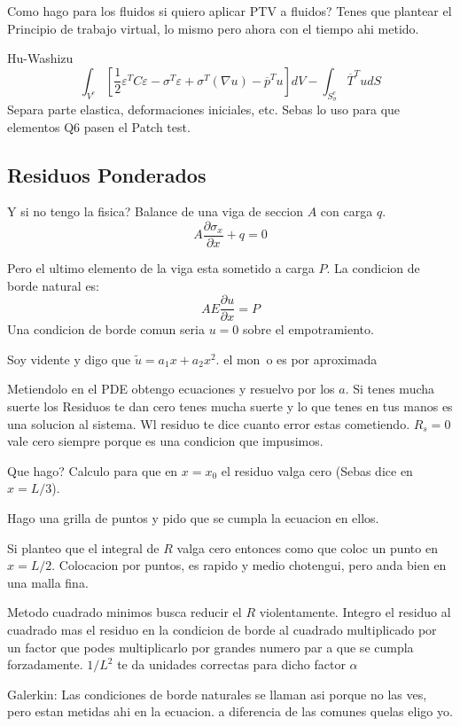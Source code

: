 \documentclass[11pt, a4paper,titlepage]{article}
\begin{document}
Como hago para los fluidos si quiero aplicar PTV a fluidos? Tenes que plantear el Principio de trabajo virtual, lo mismo pero ahora con el tiempo ahi metido.


Hu-Washizu
\[
\int_{V^{e}}\left[\frac{1}{2} \varepsilon^{T} C \varepsilon-\sigma^{T} \varepsilon+\sigma^{T}(\nabla u)-\overline{p}^{T} u\right] d V-\int_{S_{\sigma}^{e}} \overline{T}^{T} u d S
\]
Separa parte elastica, deformaciones iniciales,  etc. Sebas lo uso para que elementos Q6 pasen el Patch test.

\subsection{Residuos Ponderados}
Y si no tengo la fisica? Balance de una viga de seccion $A$ con carga $q$.
\[
A \frac{\partial \sigma_{x}}{\partial x}+q=0
\]

Pero el ultimo elemento de la viga esta sometido a carga $P$. La condicion de borde natural es:
\[
A E \frac{\partial u}{\partial x}=P
\]
Una condicion de borde comun seria $u=0$ sobre el empotramiento.

Soy vidente y digo que $\widetilde{u}=a_{1} x+a_{2} x^{2}$. el mon~o es por aproximada

Metiendolo en el PDE obtengo ecuaciones y resuelvo por los $a$. Si tenes mucha suerte los Residuos te dan cero tenes mucha suerte y lo que tenes en tus manos es una solucion al sistema. Wl residuo te dice cuanto error estas cometiendo. $R_s=0$ vale cero siempre porque es una condicion que impusimos.


Que hago? Calculo para que en $x=x_0$ el residuo valga cero (Sebas dice en $x=L/3$).  

Hago una grilla de puntos y pido que se cumpla la ecuacion en ellos.

Si planteo que el integral de $R$ valga cero entonces como que coloc un punto en $x=L/2$. Colocacion por puntos, es rapido y medio chotengui, pero anda bien en una malla fina. 

Metodo cuadrado minimos busca reducir el $R$ violentamente. Integro el residuo al cuadrado mas el residuo en la condicion de borde al cuadrado multiplicado por un factor que podes multiplicarlo por grandes numero par a que se cumpla forzadamente. $1/L^2$ te da unidades correctas para dicho factor $\alpha$ 

Galerkin: Las condiciones de borde naturales se llaman asi  porque no las ves, pero estan metidas ahi en la ecuacion. a diferencia de las comunes quelas eligo yo.
\end{document}
